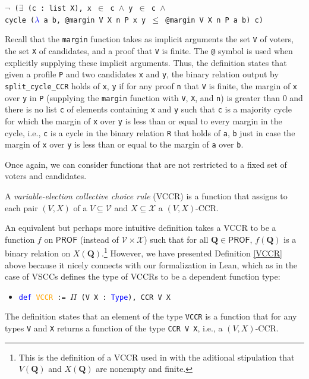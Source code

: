 \documentclass[runningheads]{llncs}
\begin{document}
\begin{example}
\begin{itemize}
    \texttt{$\neg$ ($\exists$ (c : list X), x $\in$ c $\wedge$ y $\in$ c $\wedge$}\\
    \texttt{cycle (\textcolor{blue}{$\lambda$} a b, @margin V X n P x y $\leq$ @margin V X n P a b) c)}
\end{itemize}
Recall that the \texttt{margin} function takes as implicit arguments the set \texttt{V} of voters, the set \texttt{X} of candidates, and a proof that \texttt{V} is finite. The \texttt{@} symbol is used when explicitly supplying these implicit arguments. Thus, the definition states that given a profile \texttt{P} and two candidates \texttt{x} and \texttt{y}, the binary relation output by \texttt{split\_cycle\_CCR} holds of \texttt{x}, \texttt{y} if for any proof \texttt{n} that \texttt{V} is finite, the margin of \texttt{x} over \texttt{y} in \texttt{P} (supplying the \texttt{margin} function with \texttt{V}, \texttt{X}, and \texttt{n}) is greater than 0 and there is no list \texttt{c} of elements containing \texttt{x} and \texttt{y} such that \texttt{c} is a majority cycle for which the margin of \texttt{x} over \texttt{y} is less than or equal to every margin in the cycle, i.e., \texttt{c} is a cycle in the binary relation \texttt{R} that holds of \texttt{a}, \texttt{b} just in case the margin of \texttt{x} over \texttt{y} is less than or equal to the margin of \texttt{a} over \texttt{b}.

\end{example}

Once again, we can consider functions that are not restricted to a fixed set of voters and candidates.

\begin{definition}\label{VCCR} \textnormal{A \emph{variable-election collective choice rule} (VCCR) is a function that assigns to each pair $(V,X)$ of a $V\subseteq\mathcal{V}$ and $X\subseteq\mathcal{X}$ a $(V,X)$-CCR.}
\end{definition}

\noindent An equivalent but perhaps more intuitive definition takes a VCCR to be a function $f$ on $\mathsf{PROF}$ (instead of $\mathcal{V}\times\mathcal{X}$) such that for all $\mathbf{Q}\in\mathsf{PROF}$, $f(\mathbf{Q})$ is a binary relation on $X(\mathbf{Q})$.\footnote{This is the definition of a VCCR used in \cite{HP2020} with the aditional stipulation that $V(\mathbf{Q})$ and $X(\mathbf{Q})$ are nonempty and finite.} However, we have presented Definition \ref{VCCR} above because it nicely connects with our formalization in Lean, which as in the case of VSCCs defines the type of VCCRs to be a dependent function type:
\begin{itemize}
\item[] \texttt{\textcolor{blue}{def} \textcolor{orange}{VCCR} := $\Pi$ (V X : \textcolor{blue}{Type}), CCR V X}
\end{itemize}
The definition states that an element of the type \texttt{VCCR} is a function that for any types \texttt{V} and \texttt{X} returns a function of the type \texttt{CCR V X}, i.e., a $(V,X)$-CCR.
\end{document}
